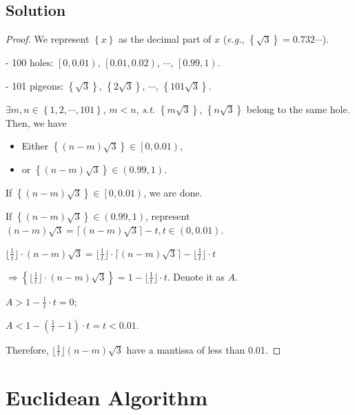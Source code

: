 \documentclass[12pt]{article}
\begin{document}
\subsection{Solution}
	\begin{proof}
		\par We represent $\left\lbrace x \right\rbrace$ as the decimal part of $x$ (\textit{e.g.}, $\left\lbrace \sqrt{3} \right\rbrace = 0.732\cdots$).
		\par  - 100 holes: $\left[ 0,0.01\right)$, $\left[ 0.01,0.02\right)$, $\cdots$, $\left[ 0.99,1\right)$.
		\par - 101 pigeons: $\left\lbrace \sqrt{3} \right\rbrace$, $\left\lbrace 2\sqrt{3} \right\rbrace$, $\cdots$, $\left\lbrace 101\sqrt{3} \right\rbrace$.
		\par $\exists m,n \in \left\lbrace 1,2,\cdots,101 \right\rbrace$, $m < n$, \textit{s.t.} $\left\lbrace m\sqrt{3} \right\rbrace$, $\left\lbrace n\sqrt{3} \right\rbrace$ belong to the same hole. Then, we have 
		\begin{itemize}
			\item Either $\left\lbrace (n-m)\sqrt{3} \right\rbrace \in \left[ 0, 0.01\right) $,
			\item or $\left\lbrace (n-m)\sqrt{3} \right\rbrace \in \left( 0.99, 1\right) $.
		\end{itemize}
		\par If $\left\lbrace (n-m)\sqrt{3} \right\rbrace \in \left[ 0, 0.01\right) $, we are done.
		\par If $\left\lbrace (n-m)\sqrt{3} \right\rbrace \in \left( 0.99, 1\right) $, represent $(n-m) \sqrt{3} = \lceil  (n-m)\sqrt{3} \rceil  - t, t \in (0,0.01)$.
		\par $\lfloor \frac{1}{t} \rfloor \cdot (n-m) \sqrt{3} = \lfloor \frac{1}{t} \rfloor \cdot \lceil (n-m) \sqrt{3} \rceil - \lfloor \frac{1}{t} \rfloor \cdot t$
		\par $\Rightarrow \left\lbrace \lfloor \frac{1}{t}\rfloor \cdot (n-m)\sqrt{3} \right\rbrace = 1 - \lfloor \frac{1}{t}\rfloor \cdot t$. Denote it as $A$.
		\par $A > 1 - \frac{1}{t} \cdot t = 0$;
		\par $A < 1 - \left( \frac{1}{t} - 1 \right) \cdot t = t < 0.01$.
		\par Therefore, $\lfloor \frac{1}{t} \rfloor (n-m) \sqrt{3}$ have a mantissa of less than 0.01.
	\end{proof}

	\section{Euclidean Algorithm}
\end{document}
